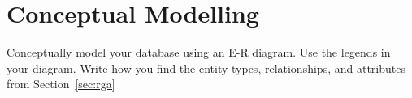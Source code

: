 \section{Conceptual Modelling}\label{sec:cm}
Conceptually model your database using an E-R diagram. Use the legends in your diagram. Write how you find the entity types, relationships, and attributes from Section~\ref{sec:rga}